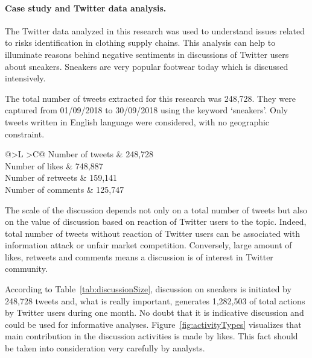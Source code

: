 \paragraph{Case study and Twitter data analysis.} The Twitter data analyzed in this research was used to understand issues related to risks identification in clothing supply chains. This analysis can help to illuminate reasons behind negative sentiments in discussions of Twitter users about sneakers. Sneakers are very popular footwear today which is discussed intensively. 

The total number of tweets extracted for this research was 248,728. They were captured from 01/09/2018 to 30/09/2018 using the keyword ‘sneakers’. Only tweets written in English language were considered, with no geographic constraint.

\begin{table} [htbp]%
	\centering
	\caption{Size of the discussion.}%
	\label{tab:discussionSize}%
	\renewcommand{\arraystretch}{1.6}%
		\begin{tabulary}{\textwidth}{@{}>{\zz}L >{\zz}C@{}}%
			\toprule     %
			Number of tweets & 248,728 \\ 
			Number of likes & 748,887  \\
			Number of retweets & 159,141 \\ 
			Number of comments & 125,747 \\ 
			\bottomrule %
		\end{tabulary}%
\end{table}

The scale of the discussion depends not only on a total number of tweets but also on the value of discussion based on reaction of Twitter users to the topic. Indeed, total number of tweets without reaction of Twitter users can be associated with information attack or unfair market competition. Conversely, large amount of likes, retweets and comments means a discussion is of interest in Twitter community.

According to Table~\cref{tab:discussionSize}, discussion on sneakers is initiated by 248,728 tweets and, what is really important, generates 1,282,503 of total actions by Twitter users during one month. No doubt that it is indicative discussion and could be used for informative analyses. Figure~\cref{fig:activityTypes} visualizes that main contribution in the discussion activities is made by likes. This fact should be taken into consideration very carefully by analysts.

